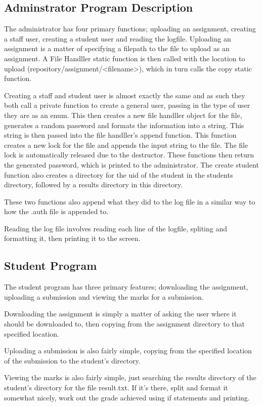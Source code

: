 \documentclass[10pt,letterpaper]{article}
\begin{document}
			\subsection{Adminstrator Program Description}
				The administrator has four primary functions; uploading an assignment, creating a staff user, creating a student user and reading the logfile. Uploading an assignment is a matter of specifying a filepath to the file to upload as an assignment. A File Handller static function is then called with the location to upload (repository/assignment/<filename>), which in turn calls the copy static function.

				Creating a staff and student user is almost exactly the same and as such they both call a private function to create a general user, passing in the type of user they are as an enum. This then creates a new file handller object for the file, generates a random password and formats the information into a string. This string is then passed into the file handller's append function. This function creates a new lock for the file and appends the input string to the file. The file lock is automatically released due to the destructor. These functions then return the generated password, which is printed to the administrator. The create student function also creates a directory for the uid of the student in the students directory, followed by a results directory in this directory.

				These two functions also append what they did to the log file in a similar way to how the .auth file is appended to.

				Reading the log file involves reading each line of the logfile, spliting and formatting it, then printing it to the screen.

			\subsection{Student Program}
				The student program has three primary features; downloading the assignment, uploading a submission and viewing the marks for a submission.

				Downloading the assignment is simply a matter of asking the user where it should be downloaded to, then copying from the assignment directory to that specified location.

				Uploading a submission is also fairly simple, copying from the specified location of the submission to the student's directory.

				Viewing the marks is also fairly simple, just searching the results directory of the student's directory for the file result.txt. If it's there, split and format it somewhat nicely, work out the grade achieved using if statements and printing.
\end{document}
